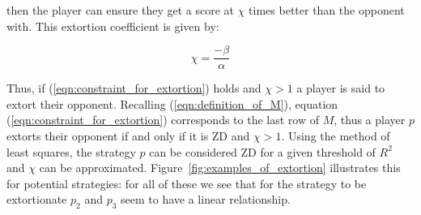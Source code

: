 \documentclass[a4paper]{article}
\begin{document}
then the player can ensure they get a score at \(\chi\) times
better than the opponent with. This extortion coefficient is given by:

\begin{equation}\label{eqn:definition_of_chi}
    \chi=\frac{-\beta}{\alpha}
\end{equation}

Thus, if (\ref{eqn:constraint_for_extortion}) holds and \(\chi >1\) a player is
said to extort their opponent. Recalling (\ref{eqn:definition_of_M}), equation
(\ref{eqn:constraint_for_extortion}) corresponds to the last row of \(M\), thus
a player \(p\) extorts their opponent if and only if it is ZD and \(\chi > 1\).
Using the method of least squares, the strategy \(p\) can be considered ZD for
a given threshold of \(R^2\) and \(\chi\) can be approximated.
Figure~\ref{fig:examples_of_extortion} illustrates this for potential
strategies: for all of these we see that for the strategy to be extortionate
\(p_2\) and \(p_3\) seem to have a linear relationship.
\end{document}
